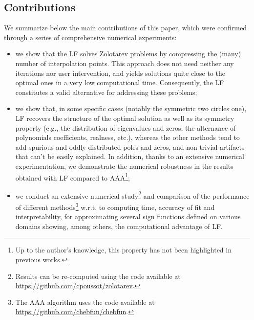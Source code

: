 \subsection{Contributions}
We summarize below the main contributions of this paper, which were confirmed through a series of comprehensive numerical experiments:
\begin{itemize}
    \item[(i)] we show that the LF solves Zolotarev problems by compressing the (many) number of  interpolation points. This approach does not need neither any iterations nor user intervention, and yields solutions quite close to the optimal ones in a very low computational time. Consequently, the LF constitutes a valid alternative for addressing these problems;
    \item[(ii)] we show that, in some specific cases (notably the symmetric two circles one), LF recovers the structure of the optimal solution as well as its symmetry property (e.g., the distribution of eigenvalues and zeros, the alternance of polynomials coefficients, realness, etc.), whereas the other methods tend to add spurious and oddly distributed poles and zeros, and non-trivial artifacts that can't be easily explained. In addition, thanks to an extensive numerical experimentation, we demonstrate the numerical robustness in the results obtained with LF compared to AAA\footnote{Up to the author's knowledge, this property has not been highlighted in previous works.};%
    \item[(iii)] we conduct an extensive numerical study\footnote{Results can be re-computed using the code available at \url{https://github.com/cpoussot/zolotarev}.} and comparison of the performance of different methods\footnote{The AAA algorithm uses the code available at \url{https://github.com/chebfun/chebfun}.} w.r.t. to computing time, accuracy of fit and interpretability, for approximating several sign functions defined on various domains showing, among others, the computational advantage of LF.
\end{itemize}

